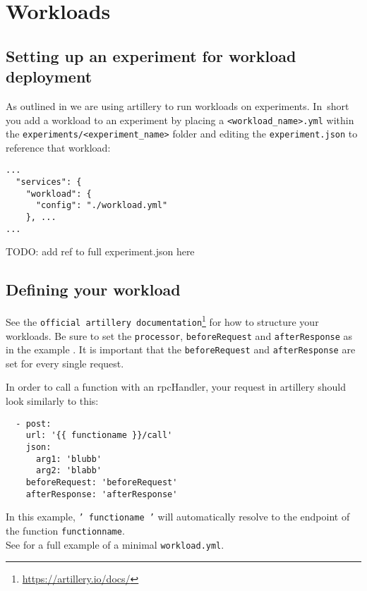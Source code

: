 \documentclass[../main.tex]{subfiles}
\begin{document}
\section{Workloads}\label{sec:WorkloadsUsage}

\subsection{Setting up an experiment for workload deployment}

As outlined in  we are using artillery to run workloads on experiments. 
In~short you add a workload to an experiment by placing a \texttt{<workload\_name>.yml} 
within the \texttt{experiments/<experiment\_name>} 
folder and editing the \texttt{experiment.json} to reference that workload:

\begin{tcolorbox}[titleDetachedStyle, title=\texttt{experiment.json}]
\begin{verbatim}
...
  "services": {
    "workload": {
      "config": "./workload.yml"
    }, ...
...
\end{verbatim}
\end{tcolorbox}

TODO: add ref to full experiment.json here

\subsection{Defining your workload}

See the \texttt{official artillery documentation}\footnote{\url{https://artillery.io/docs/}} for how to structure your workloads. 
Be sure to set the \texttt{processor}, \texttt{beforeRequest} and \texttt{afterResponse} as in the example . 
It is important that the \texttt{beforeRequest} and \texttt{afterResponse} are set for every single request.

In order to call a function with an rpcHandler, your request in artillery should look similarly to this:
\begin{tcolorbox}[titleDetachedStyle, title=\texttt{workload.yml}]
\begin{verbatim}
  - post:
    url: '{{ functioname }}/call'
    json:
      arg1: 'blubb' 
      arg2: 'blabb'
    beforeRequest: 'beforeRequest'
    afterResponse: 'afterResponse'
\end{verbatim}
\end{tcolorbox}
In this example, \texttt{'{{ functioname }}'} will automatically resolve to the endpoint of the function \texttt{functionname}. \\
See  for a full example of a minimal \texttt{workload.yml}.
\end{document}
